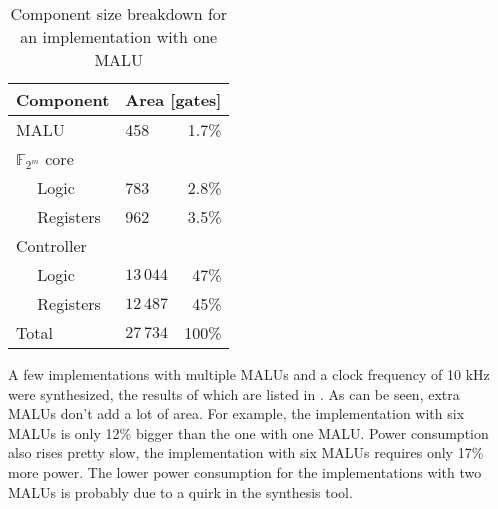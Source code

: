 \begin{table}[h]
	\caption{Component size breakdown for an implementation with one MALU}
	\label{table-breakdown}
	\centering
	\begin{tabular}{llr}
		\toprule
		Component					& \multicolumn{2}{c}{Area [gates]}\\
		\midrule
		MALU				 			& 458			& 1.7\%\\
		$\mathbb{F}_{2^m}$ core	&				& \\
		$\quad$ Logic				& 783			& 2.8\%\\
		$\quad$ Registers			& 962			& 3.5\%\\
		Controller					&				& \\
		$\quad$ Logic				& $13\,044$	& 47\%\\
		$\quad$ Registers			& $12\,487$	& 45\%\\
		\midrule
		Total							& $27\,734$	& 100\%\\
		\bottomrule		
	\end{tabular}
\end{table}

A few implementations with multiple MALUs and a clock frequency of 10 kHz were synthesized, the results of which are listed in . As can be seen, extra MALUs don't add a lot of area. For example, the implementation with six MALUs is only 12\% bigger than the one with one MALU. Power consumption also rises pretty slow, the implementation with six MALUs requires only 17\% more power. The lower power consumption for the implementations with two MALUs is probably due to a quirk in the synthesis tool.



